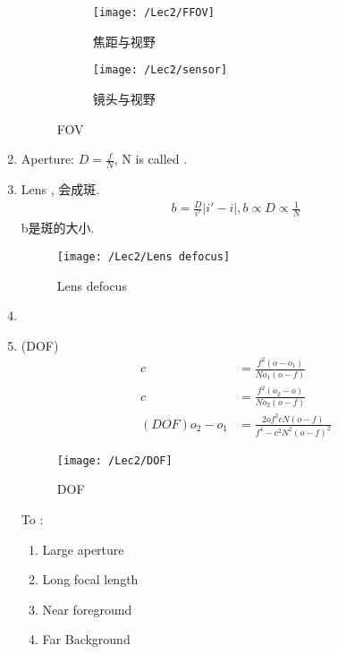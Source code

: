 \begin{enumerate}
\begin{figure}[H]
\begin{subfigure}{0.33\textwidth}
                \centering
                \texttt{[image: /Lec2/FFOV]}
                \caption{焦距与视野}
            \end{subfigure}
            \begin{subfigure}{0.33\textwidth}
                \centering
                \texttt{[image: /Lec2/sensor]}
                \caption{镜头与视野}
            \end{subfigure}
            \caption{FOV}
        \end{figure}
        \item Aperture: $D=\frac{f}{N}$, N is called .
        \item Lens , 会成斑. 
        \begin{align*}
            b=\frac{D}{i'}\left|i'-i\right|, b\varpropto D \varpropto \frac{1}{N}
        \end{align*}
        b是斑的大小.
        \begin{figure}[H]
            \centering
            \texttt{[image: /Lec2/Lens defocus]}
            \caption{Lens defocus}
        \end{figure}
        \item {}
        \item {}(DOF)
        \begin{align*}
            c&=\frac{f^2(o-o_1)}{No_1(o-f)}\\
            c&=\frac{f^2(o_2-o)}{No_2(o-f)}\\
            (DOF)o_2-o_1&=\frac{2of^2cN(o-f)}{f^4-c^2N^2(o-f)^2}
        \end{align*}
        \begin{figure}[H]
            \centering
            \texttt{[image: /Lec2/DOF]}
            \caption{DOF}
        \end{figure}

        To :\begin{enumerate}
            \item Large aperture
            \item Long focal length
            \item Near foreground
            \item Far Background
        \end{enumerate}
    \end{enumerate}

